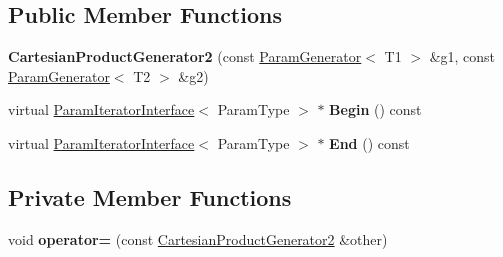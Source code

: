\subsection*{Public Member Functions}
\begin{DoxyCompactItemize}
\item 
\mbox{\label{classtesting_1_1internal_1_1_cartesian_product_generator2_a971ef5a45783db277f5fae84eaef41a3}} 
{\bfseries Cartesian\+Product\+Generator2} (const \mbox{\hyperlink{classtesting_1_1internal_1_1_param_generator}{Param\+Generator}}$<$ T1 $>$ \&g1, const \mbox{\hyperlink{classtesting_1_1internal_1_1_param_generator}{Param\+Generator}}$<$ T2 $>$ \&g2)
\item 
\mbox{\label{classtesting_1_1internal_1_1_cartesian_product_generator2_a404ef0c53d9b616c8b4635b8e364bc7c}} 
virtual \mbox{\hyperlink{classtesting_1_1internal_1_1_param_iterator_interface}{Param\+Iterator\+Interface}}$<$ Param\+Type $>$ $\ast$ {\bfseries Begin} () const
\item 
\mbox{\label{classtesting_1_1internal_1_1_cartesian_product_generator2_ad0843538562029fbc55c49928a0f6e44}} 
virtual \mbox{\hyperlink{classtesting_1_1internal_1_1_param_iterator_interface}{Param\+Iterator\+Interface}}$<$ Param\+Type $>$ $\ast$ {\bfseries End} () const
\end{DoxyCompactItemize}
\subsection*{Private Member Functions}
\begin{DoxyCompactItemize}
\item 
\mbox{\label{classtesting_1_1internal_1_1_cartesian_product_generator2_a03fca73bbce3df95d90f8004f92b3904}} 
void {\bfseries operator=} (const \mbox{\hyperlink{classtesting_1_1internal_1_1_cartesian_product_generator2}{Cartesian\+Product\+Generator2}} \&other)
\end{DoxyCompactItemize}
